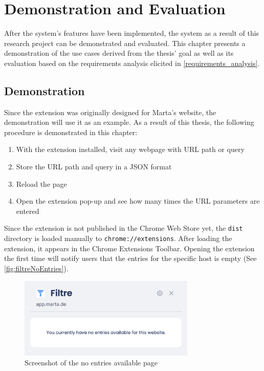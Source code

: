 \newpage
\chapter{Demonstration and Evaluation}
After the system's features have been implemented, the system as a result of this research project can be demonstrated and evaluated. This chapter presents a demonstration of the use cases derived from the thesis' goal as well as its evaluation based on the requirements analysis elicited in \autoref{requirements_analysis}.

\section{Demonstration}
Since the extension was originally designed for Marta's website, the demonstration will use it as an example. As a result of this thesis, the following procedure is demonstrated in this chapter:

\begin{enumerate}
  \item With the extension installed, visit any webpage with URL path or query
  \item Store the URL path and query in a JSON format
  \item Reload the page
  \item Open the extension pop-up and see how many times the URL parameters are entered
\end{enumerate}

Since the extension is not published in the Chrome Web Store yet, the \texttt{dist} directory is loaded manually to \verb;chrome://extensions;. After loading the extension, it appears in the Chrome Extensions Toolbar. Opening the extension the first time will notify users that the entries for the specific host is empty (See \autoref{fig:filtreNoEntries}).

\begin{figure}[ht!]
  \centering
  \includegraphics[width=0.75\textwidth]{assets/Filtre_no_entries.png}
  \caption{Screenshot of the no entries available page}
  \label{fig:filtreNoEntries}
\end{figure}

